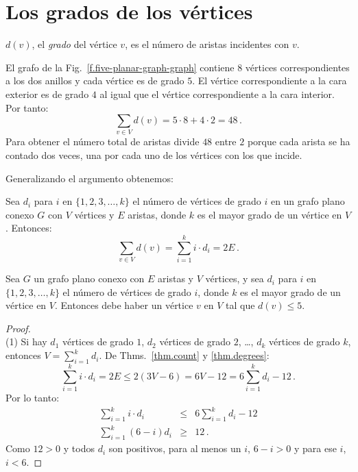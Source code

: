 {{%

\section{Los grados de los vértices}\label{s.degrees}

\begin{definition}
$d(v)$, el \emph{grado} del vértice $v$, es el número de aristas incidentes con $v$.
\end{definition}

\begin{example}
El grafo de la Fig.~\ref{f.five-planar-graph-graph} contiene $8$ vértices correspondientes a los dos anillos y cada vértice es de grado $5$. El vértice correspondiente a la cara exterior es de grado $4$ al igual que el vértice correspondiente a la cara interior. Por tanto:
\[
\sum_{v\in V} d(v) = 5\cdot 8 + 4\cdot 2=48\,.
\]
Para obtener el número total de aristas divide $48$ entre $2$ porque cada arista se ha contado dos veces, una por cada uno de los vértices con los que incide.
\end{example}

Generalizando el argumento obtenemos:
\begin{theorem}\label{thm.degrees}
Sea $d_i$ para $i$ en $\{1,2,3,\ldots,k\}$ el número de vértices de grado $i$ en un grafo plano conexo $G$ con $V$ vértices y $E$ aristas, donde $k$ es el mayor grado de un vértice en $V$. Entonces:
\[
\sum_{v\in V} d(v) =\sum_{i=1}^{k} i\cdot d_i=2E\,.
\]
\end{theorem}

\begin{theorem}\label{thm.degree5}
Sea $G$ un grafo plano conexo con $E$ aristas y $V$ vértices, y sea $d_i$ para $i$ en $\{1,2,3,\ldots,k\}$ el número de vértices de grado $i$, donde $k$ es el mayor grado de un vértice en $V$. Entonces debe haber un vértice $v$ en $V$ tal que $d(v) \leq 5$.
\end{theorem}

\begin{proof}
\mbox{}\\
(1)
Si hay $d_1$ vértices de grado $1$, $d_2$ vértices de grado $2$, \ldots, $d_k$ vértices de grado $k$, entonces $V=\sum_{i=1}^{k}d_i$.  De Thms.~\ref{thm.count} y \ref{thm.degrees}:
\[
\sum_{i=1}^{k} i\cdot d_i=2E\leq 2(3V-6) = 6V-12=6\sum_{i=1}^{k} d_i -12\,.
\]
Por lo tanto:
\begin{eqnarray*}
\sum_{i=1}^{k} i\cdot d_i &\leq& 6\sum_{i=1}^{k} d_i -12\\
\sum_{i=1}^{k} (6-i)d_i&\geq& 12\,.
\end{eqnarray*}
Como $12>0$ y todos $d_i$ son positivos, para al menos un $i$, $6-i>0$ y para ese $i$, $i<6$.
\end{proof}

}}

